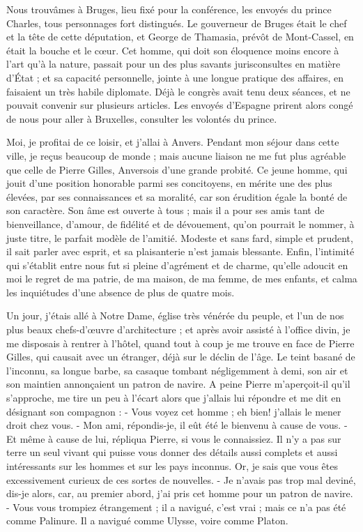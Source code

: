 \documentclass[12pt,a4paper]{article}
\begin{document}
Nous trouvâmes à Bruges, lieu fixé pour la conférence, les envoyés du prince Charles, tous personnages fort distingués. Le gouverneur de Bruges était le chef et la tête de cette députation, et George de Thamasia, prévôt de Mont-Cassel, en était la bouche et le cœur. Cet homme, qui doit son éloquence moins encore à l'art qu'à la nature, passait pour un des plus savants jurisconsultes en matière d'État ; et sa capacité personnelle, jointe à une longue pratique des affaires, en faisaient un très habile diplomate. Déjà le congrès avait tenu deux séances, et ne pouvait convenir sur plusieurs articles. Les envoyés d'Espagne prirent alors congé de nous pour aller à Bruxelles, consulter les volontés du prince. 
         
Moi, je profitai de ce loisir, et j'allai à Anvers. Pendant mon séjour dans cette ville, je reçus beaucoup de monde ; mais aucune liaison ne me fut plus agréable que celle de Pierre Gilles, Anversois d'une grande probité. Ce jeune homme, qui jouit d'une position honorable parmi ses concitoyens, en mérite une des plus élevées, par ses connaissances et sa moralité, car son érudition égale la bonté de son caractère. Son âme est ouverte à tous ; mais il a pour ses amis tant de bienveillance, d'amour, de fidélité et de dévouement, qu'on pourrait le nommer, à juste titre, le parfait modèle de l'amitié. Modeste et sans fard, simple et prudent, il sait parler avec esprit, et sa plaisanterie n'est jamais blessante. Enfin, l'intimité qui s'établit entre nous fut si pleine d'agrément et de charme, qu'elle adoucit en moi le regret de ma patrie, de ma maison, de ma femme, de mes enfants, et calma les inquiétudes d'une absence de plus de quatre mois. 
    
Un jour, j'étais allé à Notre Dame, église très vénérée du peuple, et l'un de nos plus beaux chefs-d'œuvre d'architecture ; et après avoir assisté à l'office divin, je me disposais à rentrer à l'hôtel, quand tout à coup je me trouve en face de Pierre Gilles, qui causait avec un étranger, déjà sur le déclin de l'âge. Le teint basané de l'inconnu, sa longue barbe, sa casaque tombant négligemment à demi, son air et son maintien annonçaient un patron de navire. A peine Pierre m'aperçoit-il qu'il s'approche, me tire un peu à l'écart alors que j'allais lui répondre et me dit en désignant son compagnon : - Vous voyez cet homme ; eh bien! j'allais le mener droit chez vous. - Mon ami, répondis-je, il eût été le bienvenu à cause de vous. - Et même à cause de lui, répliqua Pierre, si vous le connaissiez. Il n'y a pas sur terre un seul vivant qui puisse vous donner des détails aussi complets et aussi intéressants sur les hommes et sur les pays inconnus. Or, je sais que vous êtes excessivement curieux de ces sortes de nouvelles. - Je n'avais pas trop mal deviné, dis-je alors, car, au premier abord, j'ai pris cet homme pour un patron de navire. - Vous vous trompiez étrangement ; il a navigué, c'est vrai ; mais ce n'a pas été comme Palinure. Il a navigué comme Ulysse, voire comme Platon.
\end{document}
